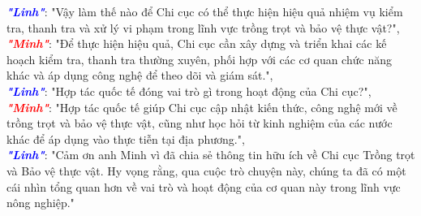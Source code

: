 \documentclass[12pt]{article}
\begin{document}
{\begin{minipage}{\textwidth}
\textcolor{blue}{\textbf{\textit{"Linh"}}}: "Vậy làm thế nào để Chi cục có thể thực hiện hiệu quả nhiệm vụ kiểm tra, thanh tra và xử lý vi phạm trong lĩnh vực trồng trọt và bảo vệ thực vật?",\\
\textcolor{red}{\textbf{\textit{"Minh"}}}: "Để thực hiện hiệu quả, Chi cục cần xây dựng và triển khai các kế hoạch kiểm tra, thanh tra thường xuyên, phối hợp với các cơ quan chức năng khác và áp dụng công nghệ để theo dõi và giám sát.",\\
\textcolor{blue}{\textbf{\textit{"Linh"}}}: "Hợp tác quốc tế đóng vai trò gì trong hoạt động của Chi cục?",\\
\textcolor{red}{\textbf{\textit{"Minh"}}}: "Hợp tác quốc tế giúp Chi cục cập nhật kiến thức, công nghệ mới về trồng trọt và bảo vệ thực vật, cũng như học hỏi từ kinh nghiệm của các nước khác để áp dụng vào thực tiễn tại địa phương.",\\
\textcolor{blue}{\textbf{\textit{"Linh"}}}: "Cảm ơn anh Minh vì đã chia sẻ thông tin hữu ích về Chi cục Trồng trọt và Bảo vệ thực vật. Hy vọng rằng, qua cuộc trò chuyện này, chúng ta đã có một cái nhìn tổng quan hơn về vai trò và hoạt động của cơ quan này trong lĩnh vực nông nghiệp."\\  
\end{minipage}
}
\end{document}
